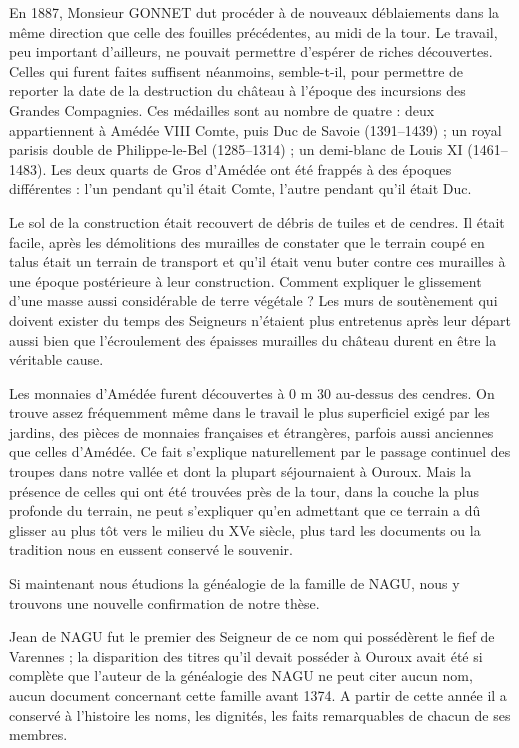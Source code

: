 En 1887, Monsieur GONNET dut procéder à de nouveaux déblaiements dans la même direction que celle des fouilles précédentes, au midi de la tour. Le travail, peu important d'ailleurs, ne pouvait permettre d'espérer de riches découvertes. Celles qui furent faites suffisent néanmoins, semble-t-il, pour permettre de reporter la date de la destruction du château à l'époque des incursions des Grandes Compagnies. Ces médailles sont au nombre de quatre : deux appartiennent à Amédée VIII Comte, puis Duc de Savoie (1391--1439) ; un royal parisis double de Philippe-le-Bel (1285--1314) ; un demi-blanc de Louis XI (1461--1483). Les deux quarts de Gros d'Amédée ont été frappés à des époques différentes : l'un pendant qu'il était Comte, l'autre pendant qu'il était Duc.

Le sol de la construction était recouvert de débris de tuiles et de cendres. Il était facile, après les démolitions des murailles de constater que le terrain coupé en talus était un terrain de
transport et qu'il était venu buter contre ces murailles à une époque postérieure à leur construction. Comment expliquer le glissement d'une masse aussi considérable de terre végétale ? Les murs de soutènement qui doivent exister du temps des Seigneurs n'étaient plus entretenus après leur départ aussi bien que l'écroulement des épaisses murailles du château durent en être la véritable cause.

Les monnaies d'Amédée furent découvertes à 0 m 30 au-dessus des cendres. On trouve assez fréquemment même dans le travail le plus superficiel exigé par les jardins, des pièces de monnaies françaises et étrangères, parfois aussi anciennes que celles d'Amédée. Ce fait s'explique naturellement par le passage continuel des troupes dans notre vallée et dont la plupart séjournaient à Ouroux. Mais la présence de celles qui ont été trouvées près de la tour, dans la couche la plus profonde du terrain, ne peut s'expliquer qu'en admettant que ce terrain a dû glisser au plus tôt vers le milieu du XVe siècle, plus tard les documents ou la tradition nous en eussent conservé le souvenir.

Si maintenant nous étudions la généalogie de la famille de NAGU, nous y trouvons une nouvelle confirmation de notre thèse.

Jean de NAGU fut le premier des Seigneur de ce nom qui possédèrent le fief de Varennes ; la disparition des titres qu'il devait posséder à Ouroux avait été si complète que l'auteur de la généalogie des NAGU ne peut citer aucun nom, aucun document concernant cette famille avant 1374. A partir de cette année il a conservé à l'histoire les noms, les dignités, les faits remarquables de chacun de ses membres.

